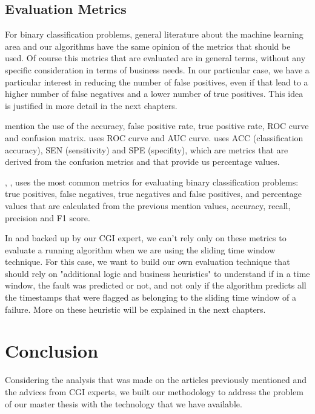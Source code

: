 \subsection{Evaluation Metrics}

For binary classification problems, general literature about the machine learning area and our algorithms have the same opinion of the metrics that should be used. Of course this metrics that are evaluated are in general terms, without any specific consideration in terms of business needs. In our particular case, we have a particular interest in reducing the number of false positives, even if that lead to a higher number of false negatives and a lower number of true positives. This idea is justified in more detail in the next chapters.

\cite{OLD_31} mention the use of the accuracy, false positive rate, true positive rate, ROC curve and confusion matrix. \cite{OLD_18_WIND} uses ROC curve and AUC curve. 
\cite{N_3_WIND} uses ACC (classification accuracy), SEN (sensitivity) and SPE (specifity), which are metrics that are derived from the confusion metrics and that provide us percentage values.

\cite{OLD_41_WIND}, \cite{ML_Alg_Analysis_2}, uses the most common metrics for evaluating binary classification problems: true positives, false negatives, true negatives and false positives, and percentage values that are calculated from the previous mention values, accuracy, recall, precision and F1 score.

In \cite{MED_1} and backed up by our CGI expert, we can't rely only on these metrics to evaluate a running algorithm when we are using the sliding time window technique. For this case, we want to build our own evaluation technique that should rely on "additional logic and business heuristics" \cite{MED_1} to understand if in a time window, the fault was predicted or not, and not only if the algorithm predicts all the timestamps that were flagged as belonging to the sliding time window of a failure. More on these heuristic will be explained in the next chapters.


\section{Conclusion} 
\label{sub:if_you_use_this_template} 

Considering the analysis that was made on the articles previously mentioned and the advices from CGI experts, we built our methodology to address the problem of our master thesis with the technology that we have available.

